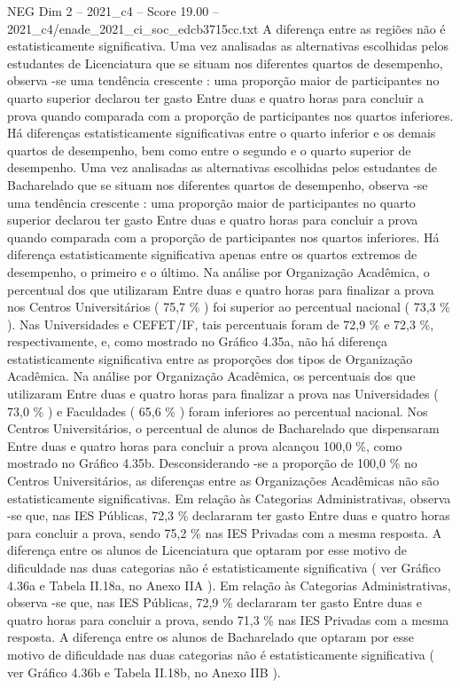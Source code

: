 \begin{textsample}{NEG Dim 2 – 2021\_c4 – Score 19.00 – 2021\_c4/enade\_2021\_ci\_soc\_edcb3715cc.txt}
A diferença entre as regiões não é estatisticamente significativa.
Uma vez analisadas as alternativas escolhidas pelos estudantes de Licenciatura que se situam nos diferentes quartos de desempenho, observa -se uma tendência crescente : uma proporção maior de participantes no quarto superior declarou ter gasto Entre duas e quatro horas para concluir a prova quando comparada com a proporção de participantes nos quartos inferiores.
Há diferenças estatisticamente significativas entre o quarto inferior e os demais quartos de desempenho, bem como entre o segundo e o quarto superior de desempenho.
Uma vez analisadas as alternativas escolhidas pelos estudantes de Bacharelado que se situam nos diferentes quartos de desempenho, observa -se uma tendência crescente : uma proporção maior de participantes no quarto superior declarou ter gasto Entre duas e quatro horas para concluir a prova quando comparada com a proporção de participantes nos quartos inferiores.
Há diferença estatisticamente significativa apenas entre os quartos extremos de desempenho, o primeiro e o último.
Na análise por Organização Acadêmica, o percentual dos que utilizaram Entre duas e quatro horas para finalizar a prova nos Centros Universitários ( 75,7 \% ) foi superior ao percentual nacional ( 73,3 \% ).
Nas Universidades e CEFET/IF, tais percentuais foram de 72,9 \% e 72,3 \%, respectivamente, e, como mostrado no Gráfico 4.35a, não há diferença estatisticamente significativa entre as proporções dos tipos de Organização Acadêmica.
Na análise por Organização Acadêmica, os percentuais dos que utilizaram Entre duas e quatro horas para finalizar a prova nas Universidades ( 73,0 \% ) e Faculdades ( 65,6 \% ) foram inferiores ao percentual nacional.
Nos Centros Universitários, o percentual de alunos de Bacharelado que dispensaram Entre duas e quatro horas para concluir a prova alcançou 100,0 \%, como mostrado no Gráfico 4.35b.
Desconsiderando -se a proporção de 100,0 \% no Centros Universitários, as diferenças entre as Organizações Acadêmicas não são estatisticamente significativas.
Em relação às Categorias Administrativas, observa -se que, nas IES Públicas, 72,3 \% declararam ter gasto Entre duas e quatro horas para concluir a prova, sendo 75,2 \% nas IES Privadas com a mesma resposta.
A diferença entre os alunos de Licenciatura que optaram por esse motivo de dificuldade nas duas categorias não é estatisticamente significativa ( ver Gráfico 4.36a e Tabela II.18a, no Anexo IIA ).
Em relação às Categorias Administrativas, observa -se que, nas IES Públicas, 72,9 \% declararam ter gasto Entre duas e quatro horas para concluir a prova, sendo 71,3 \% nas IES Privadas com a mesma resposta.
A diferença entre os alunos de Bacharelado que optaram por esse motivo de dificuldade nas duas categorias não é estatisticamente significativa ( ver Gráfico 4.36b e Tabela II.18b, no Anexo IIB ).

\end{textsample}
